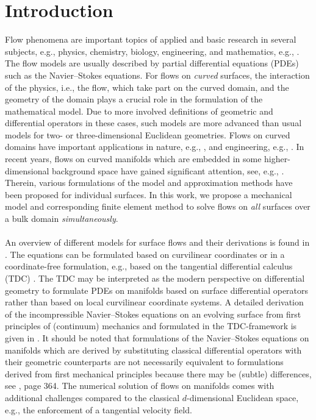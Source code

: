 \documentclass[12pt, twoside, english]{article}
\numberwithin{equation}{section}
\begin{document}
\section{Introduction\label{sec:Introduction}}
Flow phenomena are important topics of applied and basic research in several subjects, e.g., physics, chemistry, biology, engineering, and mathematics, e.g., \cite{John_2016a,Zienkiewicz_2014b,Edwards_1991a,Slattery_1990a}. The flow models are usually described by partial differential equations (PDEs) such as the Navier--Stokes equations. For flows on \emph{curved} surfaces, the interaction of the physics, i.e., the flow, which take part on the curved domain, and the geometry of the domain plays a crucial role in the formulation of the mathematical model. Due to more involved definitions of geometric and differential operators in these cases, such models are more advanced than usual models for two- or three-dimensional Euclidean geometries. Flows on curved domains have important applications in nature, e.g., \cite{Napoli_2016a,Gross_2018b}, and engineering, e.g., \cite{Zienkiewicz_2014b,Edwards_1991a,Slattery_1990a}. In recent years, flows on curved manifolds which are embedded in some higher-dimensional background space have gained significant attention, see, e.g., \cite{Jankuhn_2018a,Fries_2018a,Brandner_2022a,Brandner_2022b,Lederer_2020a,Olshanskii_2019a}. Therein, various formulations of the model and approximation methods have been proposed for individual surfaces. In this work, we propose a mechanical model and corresponding finite element method to solve flows on \emph{all} surfaces over a bulk domain \emph{simultaneously}.\\
\\
An overview of different models for surface flows and their derivations is found in \cite{Brandner_2022b}. The equations can be formulated based on curvilinear coordinates \cite{Brandner_2022b,Edwards_1991a} or in a coordinate-free formulation, e.g., based on the tangential differential calculus (TDC) \cite{Delfour_2011a,Delfour_1996a,Gurtin_1975a}. The TDC may be interpreted as the modern perspective on differential geometry to formulate PDEs on manifolds based on surface differential operators rather than based on local curvilinear coordinate systems. A detailed derivation of the incompressible Navier--Stokes equations on an evolving surface from first principles of (continuum) mechanics and formulated in  the TDC-framework is given in \cite{Jankuhn_2018a}. It should be noted that formulations of the Navier--Stokes equations on manifolds which are derived by substituting classical differential operators with their geometric counterparts are not necessarily equivalent to formulations derived from first mechanical principles because there may be (subtle) differences, see \cite{Jankuhn_2018a}, page 364. The numerical solution of flows on manifolds comes with additional challenges compared to the classical $d$-dimensional Euclidean space, e.g., the enforcement of a tangential velocity field.\\
\end{document}

